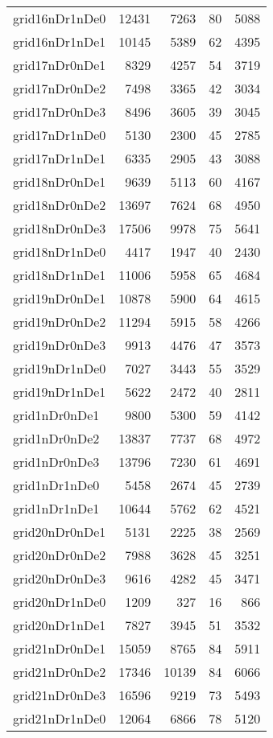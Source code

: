 \begin{longtable}{lrrrr}
grid16nDr1nDe0 & 12431 & 7263 & 80 & 5088 \\
grid16nDr1nDe1 & 10145 & 5389 & 62 & 4395 \\
grid17nDr0nDe1 & 8329 & 4257 & 54 & 3719 \\
grid17nDr0nDe2 & 7498 & 3365 & 42 & 3034 \\
grid17nDr0nDe3 & 8496 & 3605 & 39 & 3045 \\
grid17nDr1nDe0 & 5130 & 2300 & 45 & 2785 \\
grid17nDr1nDe1 & 6335 & 2905 & 43 & 3088 \\
grid18nDr0nDe1 & 9639 & 5113 & 60 & 4167 \\
grid18nDr0nDe2 & 13697 & 7624 & 68 & 4950 \\
grid18nDr0nDe3 & 17506 & 9978 & 75 & 5641 \\
grid18nDr1nDe0 & 4417 & 1947 & 40 & 2430 \\
grid18nDr1nDe1 & 11006 & 5958 & 65 & 4684 \\
grid19nDr0nDe1 & 10878 & 5900 & 64 & 4615 \\
grid19nDr0nDe2 & 11294 & 5915 & 58 & 4266 \\
grid19nDr0nDe3 & 9913 & 4476 & 47 & 3573 \\
grid19nDr1nDe0 & 7027 & 3443 & 55 & 3529 \\
grid19nDr1nDe1 & 5622 & 2472 & 40 & 2811 \\
grid1nDr0nDe1 & 9800 & 5300 & 59 & 4142 \\
grid1nDr0nDe2 & 13837 & 7737 & 68 & 4972 \\
grid1nDr0nDe3 & 13796 & 7230 & 61 & 4691 \\
grid1nDr1nDe0 & 5458 & 2674 & 45 & 2739 \\
grid1nDr1nDe1 & 10644 & 5762 & 62 & 4521 \\
grid20nDr0nDe1 & 5131 & 2225 & 38 & 2569 \\
grid20nDr0nDe2 & 7988 & 3628 & 45 & 3251 \\
grid20nDr0nDe3 & 9616 & 4282 & 45 & 3471 \\
grid20nDr1nDe0 & 1209 & 327 & 16 & 866 \\
grid20nDr1nDe1 & 7827 & 3945 & 51 & 3532 \\
grid21nDr0nDe1 & 15059 & 8765 & 84 & 5911 \\
grid21nDr0nDe2 & 17346 & 10139 & 84 & 6066 \\
grid21nDr0nDe3 & 16596 & 9219 & 73 & 5493 \\
grid21nDr1nDe0 & 12064 & 6866 & 78 & 5120 \\

\end{longtable}
